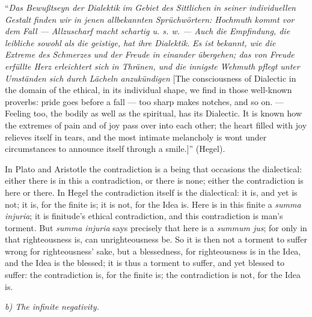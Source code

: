 \documentclass[12pt]{book}
\begin{document}
``\textit{Das Bewußtseyn der Dialektik im Gebiet des Sittlichen in seiner individuellen Gestalt finden
wir in jenen allbekannten Sprüchwörtern: Hochmuth kommt vor dem Fall — Allzuscharf macht schartig
u. s. w. — Auch die Empfindung, die leibliche sowohl als die geistige, hat ihre Dialektik.}
\textit{Es ist bekannt, wie die Extreme des Schmerzes und der Freude in einander übergehen; das von
Freude erfüllte Herz erleichtert sich in Thränen, und die innigste Wehmuth pflegt unter Umständen
sich durch Lächeln anzukündigen} [The consciousness of Dialectic in the domain of the ethical, in its
individual shape, we find in those well-known proverbs: pride goes before a fall — too sharp makes
notches, and so on. — Feeling too, the bodily as well as the spiritual, has its Dialectic. It is known
how the extremes of pain and of joy pass over into each other; the heart filled with joy relieves
itself in tears, and the most intimate melancholy is wont under circumstances to announce itself
through a smile.]'' (Hegel).

In Plato and Aristotle the contradiction is a being that occasions the dialectical: either there is in
this a contradiction, or there is none; either the contradiction is here or there. In Hegel the
contradiction itself is the dialectical: it is, and yet is not; it is, for the finite is; it is not,
for the Idea is. Here is in this finite a \textit{summa injuria}; it is finitude's ethical
contradiction, and this contradiction is man's torment. But \textit{summa injuria} says precisely that
here is a \textit{summum jus}; for only in that righteousness is, can unrighteousness be. So it is then
not a torment to suffer wrong for righteousness' sake, but a blessedness, for righteousness is in the
Idea, and the Idea is the blessed; it is thus a torment to suffer, and yet blessed to suffer: the
contradiction is, for the finite is; the contradiction is not, for the Idea is.

\emph{b) The infinite negativity.}
\end{document}
